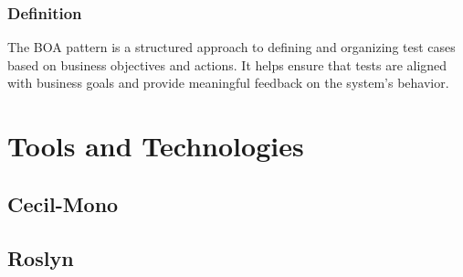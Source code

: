 \subsubsection{Definition}

The \ac{BOA} pattern is a structured approach to defining and organizing test cases based on business objectives and actions. It helps ensure that tests are aligned with business goals and provide meaningful feedback on the system's behavior.



\section{Tools and Technologies}
\subsection{Cecil-Mono}
\subsection{Roslyn}
